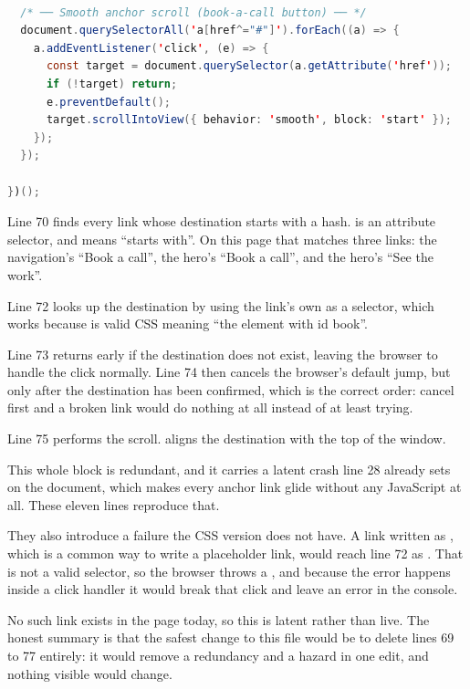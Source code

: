 \begin{lstlisting}[language=Java,firstnumber=68,caption={\file{js/main.js}, lines 68--79}]

  /* ── Smooth anchor scroll (book-a-call button) ── */
  document.querySelectorAll('a[href^="#"]').forEach((a) => {
    a.addEventListener('click', (e) => {
      const target = document.querySelector(a.getAttribute('href'));
      if (!target) return;
      e.preventDefault();
      target.scrollIntoView({ behavior: 'smooth', block: 'start' });
    });
  });

})();
\end{lstlisting}

Line 70 finds every link whose destination starts with a hash.
 is an attribute selector, and \code{\^{}=} means ``starts
with''. On this page that matches three links: the navigation's ``Book a call'',
the hero's ``Book a call'', and the hero's ``See the work''.

Line 72 looks up the destination by using the link's own  as a
selector, which works because  is valid CSS meaning ``the element
with id book''.

Line 73 returns early if the destination does not exist, leaving the browser to
handle the click normally. Line 74 then cancels the browser's default jump, but
only after the destination has been confirmed, which is the correct order: cancel
first and a broken link would do nothing at all instead of at least trying.

Line 75 performs the scroll.  aligns the destination with the
top of the window.

\begin{honest}{This whole block is redundant, and it carries a latent crash}
 line 28 already sets  on the
document, which makes every anchor link glide without any JavaScript at all. These
eleven lines reproduce that.

They also introduce a failure the CSS version does not have. A link written as
, which is a common way to write a placeholder link, would reach
line 72 as . That is not a valid selector, so
the browser throws a , and because the error happens inside a
click handler it would break that click and leave an error in the console.

No such link exists in the page today, so this is latent rather than live. The
honest summary is that the safest change to this file would be to delete lines 69
to 77 entirely: it would remove a redundancy and a hazard in one edit, and nothing
visible would change.
\end{honest}

